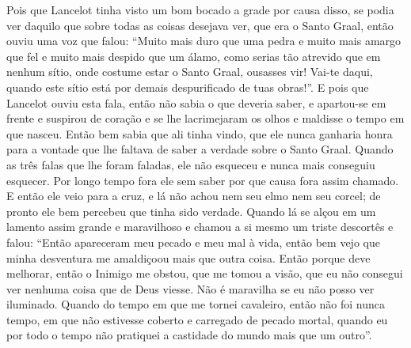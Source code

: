 Pois que Lancelot tinha visto um bom bocado a grade por causa disso, se podia
ver daquilo que sobre todas as coisas desejava ver, que era o Santo Graal,
então ouviu uma voz que falou: “Muito mais duro que uma pedra e muito mais
amargo que fel e muito mais despido que um álamo, como serias tão atrevido que
em nenhum sítio, onde costume estar o Santo Graal, ousasses vir! Vai-te daqui,
quando este sítio está por demais despurificado de tuas obras!”. E
pois que Lancelot ouviu esta fala, então não sabia o que deveria saber, e
apartou-se em frente e suspirou de coração e se lhe lacrimejaram os olhos e
maldisse o tempo em que nasceu. Então bem sabia que ali tinha vindo, que ele
nunca ganharia honra para a vontade que lhe faltava de saber a verdade sobre o
Santo Graal. Quando as três falas que lhe foram faladas, ele não esqueceu e
nunca mais conseguiu esquecer. Por longo tempo fora ele sem saber por que causa
fora assim chamado. E então ele veio para a cruz, e lá não achou nem
seu elmo nem seu corcel; de pronto ele bem percebeu que tinha sido verdade.
Quando lá se alçou em um lamento assim grande e maravilhoso e chamou a si mesmo
um triste descortês e falou: “Então apareceram meu pecado e meu mal à vida,
então bem vejo que minha desventura me amaldiçoou mais que outra coisa. Então
porque deve melhorar, então o Inimigo me obstou, que me tomou a visão, que eu
não consegui ver nenhuma coisa que de Deus viesse. Não é maravilha se eu não
posso ver iluminado. Quando do tempo em que me tornei cavaleiro, então não foi
nunca tempo, em que não estivesse coberto e carregado de pecado mortal, quando
eu por todo o tempo não pratiquei a castidade do mundo mais que um outro”. 

